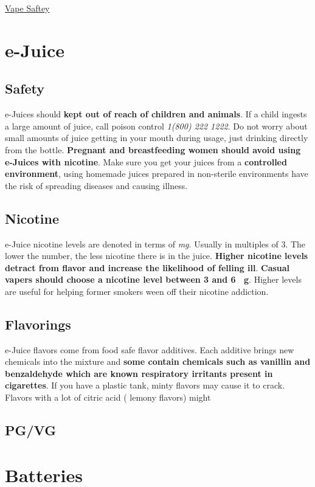 \documentclass{article}
\begin{document}
\begin{center}
\Huge{\underline{Vape Saftey}}
\end{center}
\vspace{3em}
\section*{e-Juice}
	\subsection*{Safety}
		e-Juices should \textbf{kept out of reach of children and animals}. If a child ingests a large amount of juice, 
		call poison control \emph{1(800) 222 1222}. Do not worry about small amounts of juice getting in your mouth 
		during usage, just drinking directly from the bottle. \textbf{Pregnant and breastfeeding women should avoid using 
		e-Juices with nicotine}. Make sure you get your juices from a \textbf{controlled environment}, using homemade juices
		prepared in non-sterile environments have the risk of spreading diseases and causing illness.
	\subsection*{Nicotine}
		e-Juice nicotine levels are denoted in terms of \emph{\si{\milli\gram}}. Usually in multiples of 3. The lower the 
		number, the less nicotine there is in the juice. \textbf{Higher nicotine levels detract from flavor and increase 
		the likelihood of felling ill}. \textbf{Casual vapers should choose a nicotine level between 3 and 6 \si{\milli
		\gram}}. Higher levels are useful for helping former smokers ween off their nicotine addiction.
	\subsection*{Flavorings}
		e-Juice flavors come from food safe flavor additives. Each additive brings new chemicals into the mixture and 
		\textbf{some contain chemicals such as vanillin and benzaldehyde which are known respiratory irritants present in 
		cigarettes}. If you have a plastic tank, minty flavors may cause it to crack. Flavors with a lot of citric acid (
		lemony flavors) might
	\subsection*{PG/VG}
\section*{Batteries}
\end{document}
